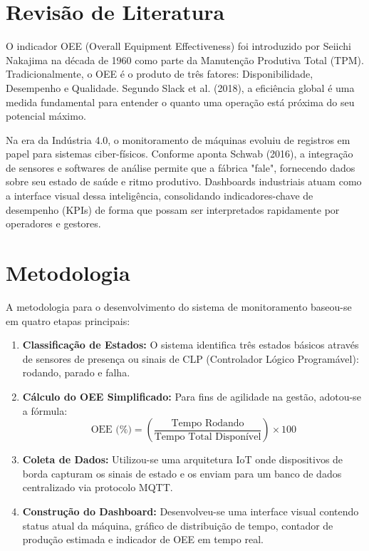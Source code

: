 \documentclass[12pt]{unisenaiclass}
\begin{document}
\section{Revisão de Literatura}
O indicador OEE (Overall Equipment Effectiveness) foi introduzido por Seiichi Nakajima na década de 1960 como parte da Manutenção Produtiva Total (TPM). Tradicionalmente, o OEE é o produto de três fatores: Disponibilidade, Desempenho e Qualidade. Segundo Slack et al. (2018), a eficiência global é uma medida fundamental para entender o quanto uma operação está próxima do seu potencial máximo.

Na era da Indústria 4.0, o monitoramento de máquinas evoluiu de registros em papel para sistemas ciber-físicos. Conforme aponta Schwab (2016), a integração de sensores e softwares de análise permite que a fábrica "fale", fornecendo dados sobre seu estado de saúde e ritmo produtivo. Dashboards industriais atuam como a interface visual dessa inteligência, consolidando indicadores-chave de desempenho (KPIs) de forma que possam ser interpretados rapidamente por operadores e gestores.

\section{Metodologia}
A metodologia para o desenvolvimento do sistema de monitoramento baseou-se em quatro etapas principais:

\begin{enumerate}
    \item \textbf{Classificação de Estados:} O sistema identifica três estados básicos através de sensores de presença ou sinais de CLP (Controlador Lógico Programável): rodando, parado e falha.
    \item \textbf{Cálculo do OEE Simplificado:} Para fins de agilidade na gestão, adotou-se a fórmula:
    \begin{equation}
        \text{OEE (\%)} = \left(\dfrac{\text{Tempo Rodando}}{\text{Tempo Total Disponível}}\right) \times 100
    \end{equation}
    \item \textbf{Coleta de Dados:} Utilizou-se uma arquitetura IoT onde dispositivos de borda capturam os sinais de estado e os enviam para um banco de dados centralizado via protocolo MQTT.
    \item \textbf{Construção do Dashboard:} Desenvolveu-se uma interface visual contendo status atual da máquina, gráfico de distribuição de tempo, contador de produção estimada e indicador de OEE em tempo real.
\end{enumerate}
\end{document}
